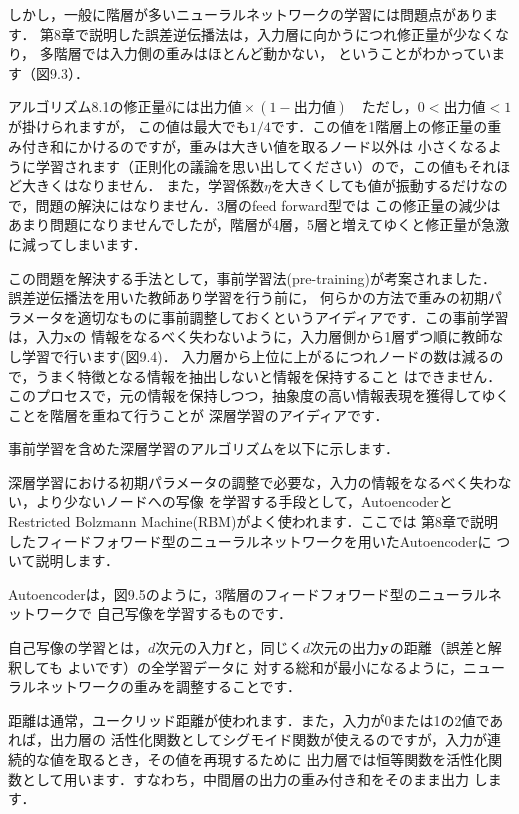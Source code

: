 しかし，一般に階層が多いニューラルネットワークの学習には問題点があります．
第8章で説明した誤差逆伝播法は，入力層に向かうにつれ修正量が少なくなり，
多階層では入力側の重みはほとんど動かない，
ということがわかっています（図9.3）．

アルゴリズム8.1の修正量$\delta$には$出力値 \times (1-出力値) \quad ただし，0<出力値<1$が掛けられますが，
この値は最大でも$1/4$です．この値を1階層上の修正量の重み付き和にかけるのですが，重みは大きい値を取るノード以外は
小さくなるように学習されます（正則化の議論を思い出してください）ので，この値もそれほど大きくはなりません．
また，学習係数$\eta$を大きくしても値が振動するだけなので，問題の解決にはなりません．3層のfeed forward型では
この修正量の減少はあまり問題になりませんでしたが，階層が4層，5層と増えてゆくと修正量が急激に減ってしまいます．


この問題を解決する手法として，事前学習法(pre-training)が考案されました．
誤差逆伝播法を用いた教師あり学習を行う前に，
何らかの方法で重みの初期パラメータを適切なものに事前調整しておくというアイディアです．この事前学習は，入力$\bm{x}$の
情報をなるべく失わないように，入力層側から1層ずつ順に教師なし学習で行います(図9.4)．
入力層から上位に上がるにつれノードの数は減るので，うまく特徴となる情報を抽出しないと情報を保持すること
はできません．このプロセスで，元の情報を保持しつつ，抽象度の高い情報表現を獲得してゆくことを階層を重ねて行うことが
深層学習のアイディアです．


事前学習を含めた深層学習のアルゴリズムを以下に示します．


深層学習における初期パラメータの調整で必要な，入力の情報をなるべく失わない，より少ないノードへの写像
を学習する手段として，AutoencoderとRestricted Bolzmann Machine(RBM)がよく使われます．ここでは
第8章で説明したフィードフォワード型のニューラルネットワークを用いたAutoencoderに
ついて説明します．

Autoencoderは，図9.5のように，3階層のフィードフォワード型のニューラルネットワークで
自己写像を学習するものです．

自己写像の学習とは，$d$次元の入力${\bf f}$と，同じく$d$次元の出力${\bf y}$の距離（誤差と解釈しても
よいです）の全学習データに
対する総和が最小になるように，ニューラルネットワークの重みを調整することです．

距離は通常，ユークリッド距離が使われます．また，入力が0または1の2値であれば，出力層の
活性化関数としてシグモイド関数が使えるのですが，入力が連続的な値を取るとき，その値を再現するために
出力層では恒等関数を活性化関数として用います．すなわち，中間層の出力の重み付き和をそのまま出力
します．

